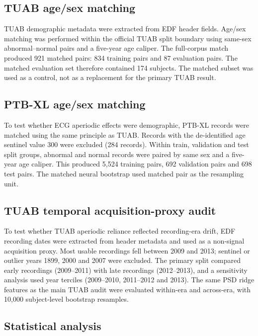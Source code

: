 \documentclass[pdflatex,sn-nature]{sn-jnl}
\begin{document}
\subsection{TUAB age/sex matching}

TUAB demographic metadata were extracted from EDF header fields. Age/sex matching was performed within the official TUAB split boundary using same-sex abnormal--normal pairs and a five-year age caliper. The full-corpus match produced 921 matched pairs: 834 training pairs and 87 evaluation pairs. The matched evaluation set therefore contained 174 subjects. The matched subset was used as a control, not as a replacement for the primary TUAB result.

\subsection{PTB-XL age/sex matching}

To test whether ECG aperiodic effects were demographic, PTB-XL records were matched using the same principle as TUAB. Records with the de-identified age sentinel value 300 were excluded (284 records). Within train, validation and test split groups, abnormal and normal records were paired by same sex and a five-year age caliper. This produced 5,524 training pairs, 692 validation pairs and 698 test pairs. The matched neural bootstrap used matched pair as the resampling unit.

\subsection{TUAB temporal acquisition-proxy audit}

To test whether TUAB aperiodic reliance reflected recording-era drift, EDF recording dates were extracted from header metadata and used as a non-signal acquisition proxy. Most usable recordings fell between 2009 and 2013; sentinel or outlier years 1899, 2000 and 2007 were excluded. The primary split compared early recordings (2009--2011) with late recordings (2012--2013), and a sensitivity analysis used year terciles (2009--2010, 2011--2012 and 2013). The same PSD ridge features as the main TUAB audit were evaluated within-era and across-era, with 10,000 subject-level bootstrap resamples.

\subsection{Statistical analysis}
\end{document}
